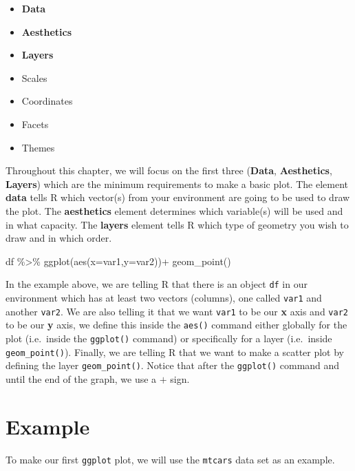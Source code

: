 \documentclass[
  letterpaper,
  DIV=11,
  numbers=noendperiod]{scrreprt}
\newenvironment{Shaded}{\begin{snugshade}}{\end{snugshade}}
\newcommand{\AttributeTok}[1]{\textcolor[rgb]{0.40,0.45,0.13}{#1}}
\newcommand{\FunctionTok}[1]{\textcolor[rgb]{0.28,0.35,0.67}{#1}}
\newcommand{\NormalTok}[1]{\textcolor[rgb]{0.00,0.23,0.31}{#1}}
\newcommand{\SpecialCharTok}[1]{\textcolor[rgb]{0.37,0.37,0.37}{#1}}
\providecommand{\tightlist}{%
  \setlength{\itemsep}{0pt}\setlength{\parskip}{0pt}}\usepackage{longtable,booktabs,array}
\begin{document}
\begin{itemize}
\tightlist
\item
  \textbf{Data}
\item
  \textbf{Aesthetics}
\item
  \textbf{Layers}
\item
  Scales
\item
  Coordinates
\item
  Facets
\item
  Themes
\end{itemize}

Throughout this chapter, we will focus on the first three
(\textbf{Data}, \textbf{Aesthetics}, \textbf{Layers}) which are the
minimum requirements to make a basic plot. The element \textbf{data}
tells R which vector(s) from your environment are going to be used to
draw the plot. The \textbf{aesthetics} element determines which
variable(s) will be used and in what capacity. The \textbf{layers}
element tells R which type of geometry you wish to draw and in which
order.

\begin{Shaded}
\begin{Highlighting}[]
\NormalTok{df }\SpecialCharTok{\%\textgreater{}\%} 
  \FunctionTok{ggplot}\NormalTok{(}\FunctionTok{aes}\NormalTok{(}\AttributeTok{x=}\NormalTok{var1,}\AttributeTok{y=}\NormalTok{var2))}\SpecialCharTok{+}
  \FunctionTok{geom\_point}\NormalTok{()}
\end{Highlighting}
\end{Shaded}

In the example above, we are telling R that there is an object
\texttt{df} in our environment which has at least two vectors (columns),
one called \texttt{var1} and another \texttt{var2}. We are also telling
it that we want \texttt{var1} to be our \textbf{x} axis and
\texttt{var2} to be our \textbf{y} axis, we define this inside the
\texttt{aes()} command either globally for the plot (i.e.~inside the
\texttt{ggplot()} command) or specifically for a layer (i.e.~inside
\texttt{geom\_point()}). Finally, we are telling R that we want to make
a scatter plot by defining the layer \texttt{geom\_point()}. Notice that
after the \texttt{ggplot()} command and until the end of the graph, we
use a \(+\) sign.

\section{Example}\label{example}

To make our first \texttt{ggplot} plot, we will use the \texttt{mtcars}
data set as an example.
\end{document}
